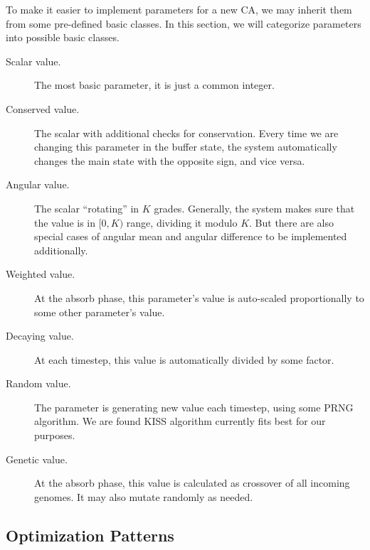 \documentclass[a4paper,12pt,tikz,UTF8]{article}
\begin{document}
    To make it easier to implement parameters for a new CA, we may inherit them from some pre-defined basic classes. In this section, we will categorize parameters into possible basic classes.
    \begin{description}
      \item [Scalar value.] The most basic parameter, it is just a common integer.
      \item [Conserved value.] The scalar with additional checks for conservation. Every time we are changing this parameter in the buffer state, the system automatically changes the main state with the opposite sign, and vice versa.
      \item [Angular value.] The scalar ``rotating'' in $K$ grades. Generally, the system makes sure that the value is in $[0, K)$ range, dividing it modulo $K$. But there are also special cases of angular mean and angular difference to be implemented additionally.
      \item [Weighted value.] At the absorb phase, this parameter's value is auto-scaled proportionally to some other parameter's value. 
      \item [Decaying value.] At each timestep, this value is automatically divided by some factor.
      \item [Random value.] The parameter is generating new value each timestep, using some PRNG algorithm. We are found KISS algorithm currently fits best for our purposes.
      \item [Genetic value.] At the absorb phase, this value is calculated as crossover of all incoming genomes. It may also mutate randomly as needed.
    \end{description}

  \subsection{Optimization Patterns}
\end{document}
